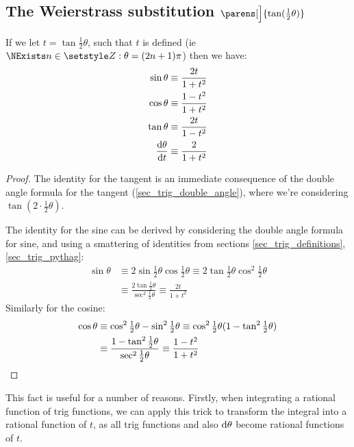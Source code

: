 \subsection[The Weierstrass substitution
            \texorpdfstring{(\(\tan(\theta / 2)\))}{(tangent half-angle)}]
   {The Weierstrass substitution \boldmath\(\parens[\Big]{\tan(\tfrac 12 \theta)}\)}

\begin{theorem}
 If we let \(t = \tan \tfrac 12 \theta\), such that \(t\) is defined (ie
 \(\NExists n \in \Integers: \theta = (2n + 1)\pi\)) then we have:
 \begin{align*}
  \sin \theta &\equiv \frac{2t}{1 + t^2} \\
  \cos \theta &\equiv \frac{1 - t^2}{1 + t^2} \\
  \tan \theta &\equiv \frac{2t}{1 - t^2} \\
  \dv<\theta>{t} &\equiv \frac 2{1 + t^2}
 \end{align*}
\end{theorem}
\begin{proof}
 The identity for the tangent is an immediate consequence of the double
 angle formula for the tangent (\ref{sec_trig_double_angle}), where we're
 considering \(\tan{(2 \cdot \frac 12 \theta)}\).

 The identity for the sine can be derived by considering the double angle
 formula for sine, and using a smattering of identities from sections
 \ref{sec_trig_definitions}, \ref{sec_trig_pythag}:
 \begin{align*}
  \sin \theta &\equiv 2\sin \tfrac 12 \theta \cos\tfrac 12 \theta
      \equiv 2\tan \tfrac 12 \theta \cos^2 \tfrac 12 \theta \\
      &\equiv \frac{2\tan \tfrac 12 \theta}{\sec^2 \tfrac 12 \theta}
      \equiv \frac{2t}{1 + t^2}
 \end{align*}
 Similarly for the cosine:
 \begin{align*}
  \cos \theta
      &\equiv \cos^2 \tfrac 12 \theta - \sin^2 \tfrac 12 \theta
      \equiv \cos^2 \tfrac 12 \theta
          (1 - \tan^2 \tfrac 12 \theta) \\
      &\equiv \frac{1 - \tan^2 \tfrac 12 \theta}
                   {\sec^2 \tfrac 12 \theta}
      \equiv \frac{1 - t^2}{1 + t^2} \qedhere
 \end{align*}
\end{proof}

This fact is useful for a number of reasons. Firstly, when integrating a
rational function of trig functions, we can apply this trick to transform
the integral into a rational function of \(t\), as all trig functions and
also \(\mathrm d \theta\) become rational functions of \(t\).

